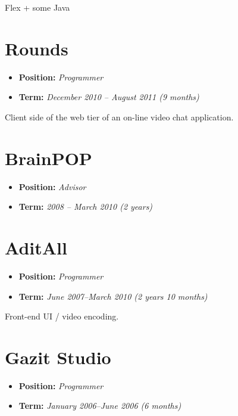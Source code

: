 \documentclass[oneside]{memoir}
\begin{document}
Flex + some Java
\section{Rounds}
\label{sec-3-4}
\begin{itemize}
\item \textbf{Position:} \emph{Programmer}
\item \textbf{Term:} \emph{December 2010 – August 2011 (9 months)}
\end{itemize}

Client side of the web tier of an on-line video chat application.
\section{BrainPOP}
\label{sec-3-5}
\begin{itemize}
\item \textbf{Position:} \emph{Advisor}
\item \textbf{Term:} \emph{2008 – March 2010 (2 years)}
\end{itemize}
\section{AditAll}
\label{sec-3-6}
\begin{itemize}
\item \textbf{Position:} \emph{Programmer}
\item \textbf{Term:} \emph{June 2007--March 2010 (2 years 10 months)}
\end{itemize}

Front-end UI / video encoding.
\section{Gazit Studio}
\label{sec-3-7}
\begin{itemize}
\item \textbf{Position:} \emph{Programmer}
\item \textbf{Term:} \emph{January 2006--June 2006 (6 months)}
\end{itemize}
\end{document}

